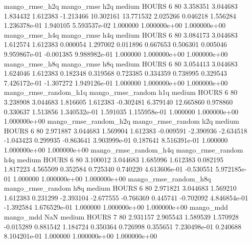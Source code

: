        mango_rmse_h2q        mango_rmse                  h2q     medium    HOURS                 6 80  3.358351       3.044683 1.834432       1.612383   -1.213466     10.302161     13.771532     2.025266       0.046218  1.556284 1.236378e-01     1.940105   5.593537e-02            1.000000    1.000000e+00        1.000000e+00
       mango_rmse_h4q        mango_rmse                  h4q     medium    HOURS                 6 80  3.084173       3.044683 1.612574       1.612383    0.000054      1.297002      0.011896     0.667653       0.506301  0.005046 9.959867e-01    -0.001385   9.988982e-01            1.000000    1.000000e+00        1.000000e+00
       mango_rmse_h8q        mango_rmse                  h8q     medium    HOURS                 6 80  3.054413       3.044683 1.624046       1.612383    0.182348      0.319568      0.723385     0.334359       0.738995  0.329543 7.426172e-01    -1.307272   1.949126e-01            1.000000    1.000000e+00        1.000000e+00
mango_rmse_random_h1q mango_rmse_random                  h1q     medium    HOURS                 6 80  3.238908       3.044683 1.816605       1.612383   -0.302481      6.379140     12.665860     0.978860       0.330637  1.513856 1.340532e-01     1.591035   1.155958e-01            1.000000    1.000000e+00        1.000000e+00
mango_rmse_random_h2q mango_rmse_random                  h2q     medium    HOURS                 6 80  2.971887       3.044683 1.569904       1.612383   -0.009591     -2.390936     -2.634518    -1.043423       0.299935 -0.863641 3.903999e-01     0.187641   8.516391e-01            1.000000    1.000000e+00        1.000000e+00
mango_rmse_random_h4q mango_rmse_random                  h4q     medium    HOURS                 6 80  3.100012       3.044683 1.685996       1.612383    0.082195      1.817223      4.565509     0.352584       0.725340  0.740220 4.613606e-01    -0.530551   5.972185e-01            1.000000    1.000000e+00        1.000000e+00
mango_rmse_random_h8q mango_rmse_random                  h8q     medium    HOURS                 6 80  2.971821       3.044683 1.569210       1.612383    0.231299     -2.393104     -2.677555    -0.766369       0.445741 -0.702092 4.846854e-01    -1.392584   1.676529e-01            1.000000    1.000000e+00        1.000000e+00
            mango_mdd         mango_mdd                  NaN     medium    HOURS                 7 80  2.931157       2.905543 1.589539       1.570928   -0.015289      0.881542      1.184724     0.350364       0.726998  0.355651 7.230498e-01     0.240688   8.104201e-01            1.000000    1.000000e+00        1.000000e+00

